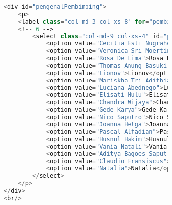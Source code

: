 \begin{lstlisting}[language=PHP,basicstyle=\tiny,caption=skripsi.php]
					
						<div id="pengenalPembimbing">
							<p>
							<label class="col-md-3 col-xs-8" for="pembimbing">Pembimbing:</label>
							<!-- 6 -->
								<select class="col-md-9 col-xs-4" id="pembimbing" name="namaPembimbing" ng-model="namaPembimbing">
									<option value="Cecilia Esti Nugraheni">Cecilia Esti Nugraheni</option>
									<option value="Veronica Sri Moertini">Veronica Sri Moertini</option>
									<option value="Rosa De Lima">Rosa De Lima</option>
									<option value="Thomas Anung Basuki">Thomas Anung Basuki</option>
									<option value="Lionov">Lionov</option>
									<option value="Mariskha Tri Adithia">Mariskha Tri Adithia</option>
									<option value="Luciana Abednego">Luciana Abednego</option>
									<option value="Elisati Hulu">Elisati Hulu</option>
									<option value="Chandra Wijaya">Chandra Wijaya</option>
									<option value="Gede Karya">Gede Karya</option>
									<option value="Nico Saputro">Nico Saputro</option>
									<option value="Joanna Helga">Joanna Helga</option>
									<option value="Pascal Alfadian">Pascal Alfadian</option>
									<option value="Husnul Hakim">Husnul Hakim</option>
									<option value="Vania Natali">Vania Natali</option>
									<option value="Aditya Bagoes Saputra">Aditya Bagoes Saputra</option>
									<option value="Claudio Fransiscus">Claudio Fransiscus</option>
									<option value="Natalia">Natalia</option>
								</select>
							</p>
						</div>
						<br/>
					

\end{lstlisting}
